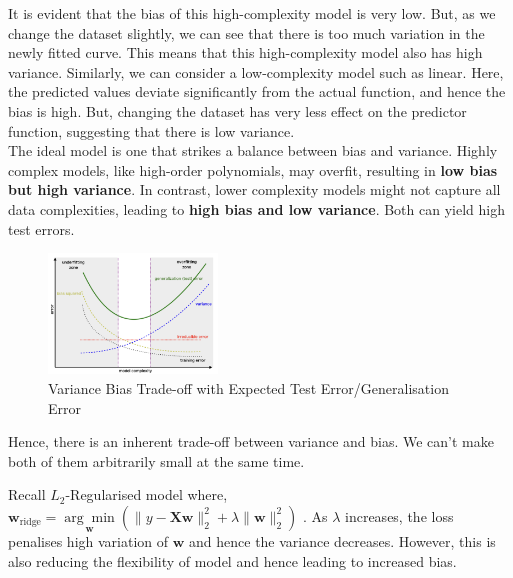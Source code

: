 \documentclass{report}
\newcommand{\w}{\mathbf{w}} %
\newcommand\norm[1]{\lVert#1\rVert}
\begin{document}
It is evident that the bias of this high-complexity model is very low. But, as we change the dataset slightly, we can see that there is too much variation in the newly fitted curve. This means that this high-complexity model also has high variance. Similarly, we can consider a low-complexity model such as linear. Here, the predicted values deviate significantly from the actual function, and hence the bias is high. But, changing the dataset has very less effect on the predictor function, suggesting that there is low variance. \\

The ideal model is one that strikes a balance between bias and variance. Highly complex models, like high-order polynomials, may overfit, resulting in \textbf{low bias but high variance}. In contrast, lower complexity models might not capture all data complexities, leading to \textbf{high bias and low variance}. Both can yield high test errors.

\begin{figure}[H]
  \centering
  \includegraphics[width = 0.4\textwidth]{images/16.png}
  \caption{Variance Bias Trade-off with Expected Test Error/Generalisation Error}
\end{figure}

Hence, there is an inherent trade-off between variance and bias. We can't make both of them arbitrarily small at the same time. \\

\begin{mdframed}
  Recall $L_2$-Regularised model where,
  $
    \w_{\text{ridge}} = \underset{\w}{\arg\min}
    \left(\norm{y - \mathbf{X}\w}_2^2 + \lambda\norm{\w}_2^2\right)
  $
  . As $\lambda$ increases, the loss penalises high variation of $\w$ and hence the variance decreases. However, this is also reducing the flexibility of model and hence leading to increased bias.
\end{mdframed}
\end{document}
